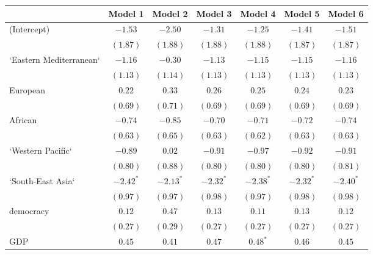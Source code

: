 
\begin{table}[!h]
\begin{center}
\begin{tabular}{l c c c c c c }
\toprule
 & Model 1 & Model 2 & Model 3 & Model 4 & Model 5 & Model 6 \\
\midrule
(Intercept)             & $-1.53$      & $-2.50$      & $-1.31$      & $-1.25$      & $-1.41$      & $-1.51$      \\
                        & $(1.87)$     & $(1.88)$     & $(1.88)$     & $(1.88)$     & $(1.87)$     & $(1.87)$     \\
`Eastern Mediterranean` & $-1.16$      & $-0.30$      & $-1.13$      & $-1.15$      & $-1.15$      & $-1.16$      \\
                        & $(1.13)$     & $(1.14)$     & $(1.13)$     & $(1.13)$     & $(1.13)$     & $(1.13)$     \\
European                & $0.22$       & $0.33$       & $0.26$       & $0.25$       & $0.24$       & $0.23$       \\
                        & $(0.69)$     & $(0.71)$     & $(0.69)$     & $(0.69)$     & $(0.69)$     & $(0.69)$     \\
African                 & $-0.74$      & $-0.85$      & $-0.70$      & $-0.71$      & $-0.72$      & $-0.74$      \\
                        & $(0.63)$     & $(0.65)$     & $(0.63)$     & $(0.62)$     & $(0.63)$     & $(0.63)$     \\
`Western Pacific`       & $-0.89$      & $0.02$       & $-0.91$      & $-0.97$      & $-0.92$      & $-0.91$      \\
                        & $(0.80)$     & $(0.88)$     & $(0.80)$     & $(0.80)$     & $(0.80)$     & $(0.81)$     \\
`South-East Asia`       & $-2.42^{*}$  & $-2.13^{*}$  & $-2.32^{*}$  & $-2.38^{*}$  & $-2.32^{*}$  & $-2.40^{*}$  \\
                        & $(0.97)$     & $(0.97)$     & $(0.98)$     & $(0.97)$     & $(0.98)$     & $(0.98)$     \\
democracy               & $0.12$       & $0.47$       & $0.13$       & $0.11$       & $0.13$       & $0.12$       \\
                        & $(0.27)$     & $(0.29)$     & $(0.27)$     & $(0.27)$     & $(0.27)$     & $(0.27)$     \\
GDP                     & $0.45$       & $0.41$       & $0.47$       & $0.48^{*}$   & $0.46$       & $0.45$       \\

\end{tabular}
\end{center}
\end{table}
